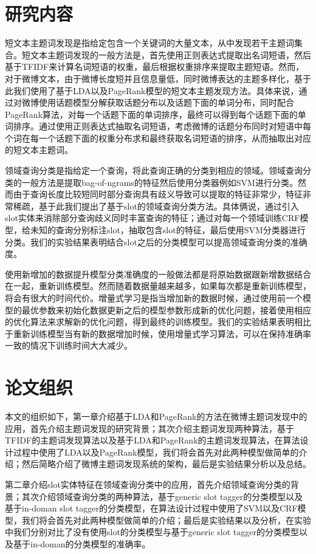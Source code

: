 \documentclass[master]{njuthesis}
\begin{document}
\section{研究内容}

    短文本主题词发现是指给定包含一个关键词的大量文本，从中发现若干主题词集合。短文本主题词发现的一般方法是，首先使用正则表达式提取出名词短语，然后基于TFIDF来计算名词短语的权重，最后根据权重排序来提取主题短语。然而，对于微博文本，由于微博长度短并且信息量低，同时微博表达的主题多样化，基于此我们使用了基于LDA以及PageRank模型的短文本主题发现方法。具体来说，通过对微博使用话题模型分解获取话题分布以及话题下面的单词分布，同时配合PageRank算法，对每一个话题下面的单词排序，最终可以得到每个话题下面的单词排序。通过使用正则表达式抽取名词短语，考虑微博的话题分布同时对短语中每个词在每一个话题下面的权重分布求和最终获取名词短语的排序，从而抽取出对应的短文本主题词。

    领域查询分类是指给定一个查询，将此查询正确的分类到相应的领域。领域查询分类的一般方法是提取bag-of-ngrams的特征然后使用分类器例如SVM进行分类。然而由于查询长度比较短同时部分查询具有歧义导致可以提取的特征非常少，特征非常稀疏，基于此我们提出了基于slot的领域查询分类方法。具体俩说，通过引入slot实体来消除部分查询歧义同时丰富查询的特征；通过对每一个领域训练CRF模型，给未知的查询分别标注slot，抽取包含slot的特征，最后使用SVM分类器进行分类。我们的实验结果表明结合slot之后的分类模型可以提高领域查询分类的准确度。

    使用新增加的数据提升模型分类准确度的一般做法都是将原始数据跟新增数据结合在一起，重新训练模型。然而随着数据量越来越多，如果每次都是重新训练模型，将会有很大的时间代价。增量式学习是指当增加新的数据时候，通过使用前一个模型的最优参数来初始化数据更新之后的模型参数形成新的优化问题，接着使用相应的优化算法来求解新的优化问题，得到最终的训练模型。我们的实验结果表明相比于重新训练模型当有新的数据增加时候，使用增量式学习算法，可以在保持准确率一致的情况下训练时间大大减少。

\section{论文组织}

    本文的组织如下，第一章介绍基于LDA和PageRank的方法在微博主题词发现中的应用，首先介绍主题词发现的研究背景；其次介绍主题词发现两种算法，基于TFIDF的主题词发现算法以及基于LDA和PageRank的主题词发现算法，在算法设计过程中使用了LDA以及PageRank模型，我们将会首先对此两种模型做简单的介绍；然后简略介绍了微博主题词发现系统的架构，最后是实验结果分析以及总结。

    第二章介绍slot实体特征在领域查询分类中的应用，首先介绍领域查询分类的背景；其次介绍领域查询分类的两种算法，基于generic slot tagger的分类模型以及基于in-doman slot tagger的分类模型，在算法设计过程中使用了SVM以及CRF模型，我们将会首先对此两种模型做简单的介绍；最后是实验结果以及分析，在实验中我们分别对比了没有使用slot的分类模型与基于generic slot tagger的分类模型以及基于in-doman的分类模型的准确率。
\end{document}
